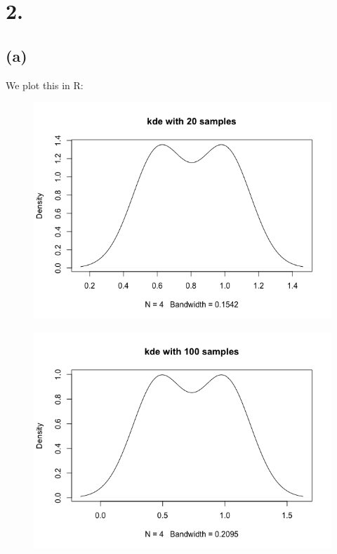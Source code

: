 \documentclass{article}
\begin{document}
\section*{2.}
{\Large

\subsection*{(a)}

We plot this in R:
\begin{figure}[h!]
  \centering
  \includegraphics[width=500pt]{hw5_2a_20.png}
\end{figure}
\begin{figure}[h!]
  \centering
  \includegraphics[width=500pt]{hw5_2a_100.png}
\end{figure}
}
\end{document}
